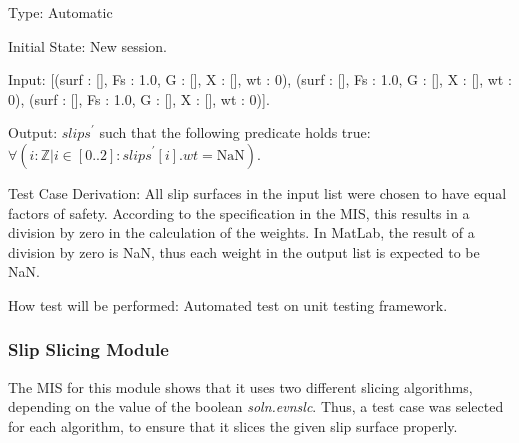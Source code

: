 \documentclass[12pt, titlepage]{article}
\begin{document}
\begin{enumerate}[label=TC\arabic*:,ref={\arabic*}]
	Type: Automatic
	
	Initial State: New session.
	
	Input: [(surf : [], Fs : 1.0, G : [], X : [], wt : 0), (surf : [], Fs : 
	1.0, G : [], X : [], wt : 0), (surf : [], Fs : 1.0, G : [], X : [], wt : 
	0)].
	
	Output: $\textit{slips}^\prime$ such that the following predicate holds 
	true:\\ 
	$\forall(i : \mathbb{Z} | i \in [0..2] : \textit{slips}^\prime[i].wt = 
	\text{NaN})$.
	
	Test Case Derivation: All slip surfaces in the input list were chosen to 
	have equal factors of safety. According to the specification in the MIS, 
	this results in a division by zero in the calculation of the weights. In 
	MatLab, the result of a division by zero is NaN, thus each weight in the 
	output list is expected to be NaN.
	
	How test will be performed: Automated test on unit testing framework.

\end{enumerate}

\subsubsection{Slip Slicing Module}
The MIS for this module shows that it uses two different slicing algorithms, 
depending on the value of the boolean \textit{soln.evnslc}. Thus, a test case 
was selected for each algorithm, to ensure that it slices the given slip 
surface properly.
\end{document}
